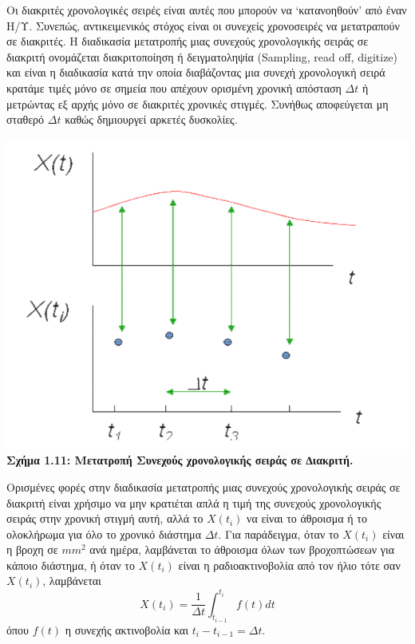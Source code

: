 Οι διακριτές χρονολογικές σειρές είναι αυτές που μπορούν να ‘κατανοηθούν’
από έναν Η/Υ. Συνεπώς, αντικειμενικός στόχος είναι οι συνεχείς χρονοσειρές να
μετατραπούν σε διακριτές. Η διαδικασία μετατροπής μιας συνεχούς χρονολογικής
σειράς σε διακριτή ονομάζεται διακριτοποίηση ή δειγματοληψία (Sampling, read off,
digitize) και είναι η διαδικασία κατά την οποία διαβάζοντας μια συνεχή χρονολογική
σειρά κρατάμε τιμές μόνο σε σημεία που απέχουν ορισμένη χρονική απόσταση $\Delta t$ ή
μετρώντας εξ αρχής μόνο σε διακριτές χρονικές στιγμές. Συνήθως αποφεύγεται μη
σταθερό $\Delta t$ καθώς δημιουργεί αρκετές δυσκολίες.\\
\begin{center}
\includegraphics[scale=0.4]{graf7.png}\\
\textbf{Σχήμα 1.11: Μετατροπή Συνεχούς χρονολογικής σειράς σε ∆ιακριτή.}
\end{center}
Ορισμένες φορές στην διαδικασία μετατροπής μιας συνεχούς χρονολογικής σειράς σε
διακριτή είναι χρήσιμο να μην κρατιέται απλά η τιμή της συνεχούς χρονολογικής
σειράς στην χρονική στιγμή αυτή, αλλά το $ X\left(t_i\right)$
να είναι το άθροισμα ή το
ολοκλήρωμα για όλο το χρονικό διάστημα $ \Delta t$. Για παράδειγμα, όταν το $ X\left(t_i\right)$
είναι η βροχη σε $ mm^2 $ 
ανά ημέρα, λαμβάνεται το άθροισμα όλων των βροχοπτώσεων για κάποιο διάστημα, ή όταν το $ X\left(t_i\right)$
είναι η ραδιοακτινοβολία από τον ήλιο τότε σαν
$ X\left(t_i\right)$, λαμβάνεται\\
$$ X\left(t_i\right)=\frac{1}{\Delta t}\int_{t_{i-1}}^{t_i} f\left(t\right) dt $$
όπου $f\left(t\right) $ η συνεχής ακτινοβολία και $t_i-t_{i-1}=\Delta t. $\\

